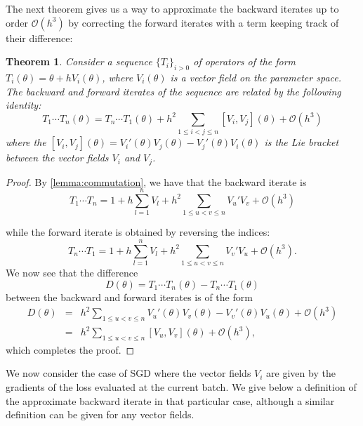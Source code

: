 \documentclass[10pt]{article} %
\theoremstyle{plain}
\newtheorem{theorem}{Theorem}[section]
\theoremstyle{definition}
\theoremstyle{remark}
\begin{document}
The next theorem gives us a way to approximate the backward iterates up to order $\mathcal O(h^3)$ by correcting the forward iterates with a term keeping track of their difference:

\begin{theorem}\label{thm:approximate_backward}
Consider a sequence $\{T_i\}_{i > 0}$ of operators of the form $T_i(\theta) = \theta + h V_i(\theta)$, where $V_i(\theta)$ is a vector field on the parameter space. The backward and forward iterates of the sequence are related by the following identity:
\begin{equation*}
    T_1 \cdots T_n(\theta) = T_n \cdots T_1(\theta) + h^2 \sum_{1\leq i<j\leq n} [V_i, V_j](\theta) + \mathcal O(h^3)
\end{equation*}
where the $[V_i, V_j](\theta) = V_i'(\theta)V_j(\theta) - V_j'(\theta)V_i(\theta)$ is the Lie bracket between the vector fields $V_i$ and $V_j$.
\end{theorem}

\begin{proof}
By \cref{lemma:commutation}, we have that the backward iterate is 
\begin{equation*}
    T_{1}  \cdots T_{n}=  
    1
    + h \sum_{l=1}^n V_{l}
    + h^2 \sum_{1 \leq u < v\leq n} V_{u}' V_{v}
    + \mathcal O(h^3)
\end{equation*}

while the forward iterate is obtained by reversing the indices:
\begin{equation*}
    T_{n}  \cdots T_{1}=  
    1
    + h \sum_{l=1}^n V_{l}
    + h^2 \sum_{1 \leq u < v\leq n} V_{v}' V_{u}
    + \mathcal O(h^3).
\end{equation*}
We now see that the difference
\[D(\theta) =  T_{1}  \cdots T_{n}(\theta) -  T_{n}  \cdots T_{1}(\theta)\]
between the backward and forward iterates is of the form
\begin{eqnarray*}
     D(\theta)
     & = & h^2 \sum_{1 \leq u < v\leq n} V_{u}'(\theta) V_{v}(\theta) - V_{v}'(\theta) V_{u}(\theta) + \mathcal O(h^3)\\
     & = & h^2 \sum_{1 \leq u < v\leq n} [V_u, V_v](\theta)  + \mathcal O(h^3),
\end{eqnarray*}
which completes the proof.
\end{proof}

We now consider the case of SGD where the vector fields $V_i$ are given by the gradients of the loss evaluated at the current batch. We give below a definition of the approximate backward iterate in that particular case, although a similar definition can be given for any vector fields. 
\end{document}
